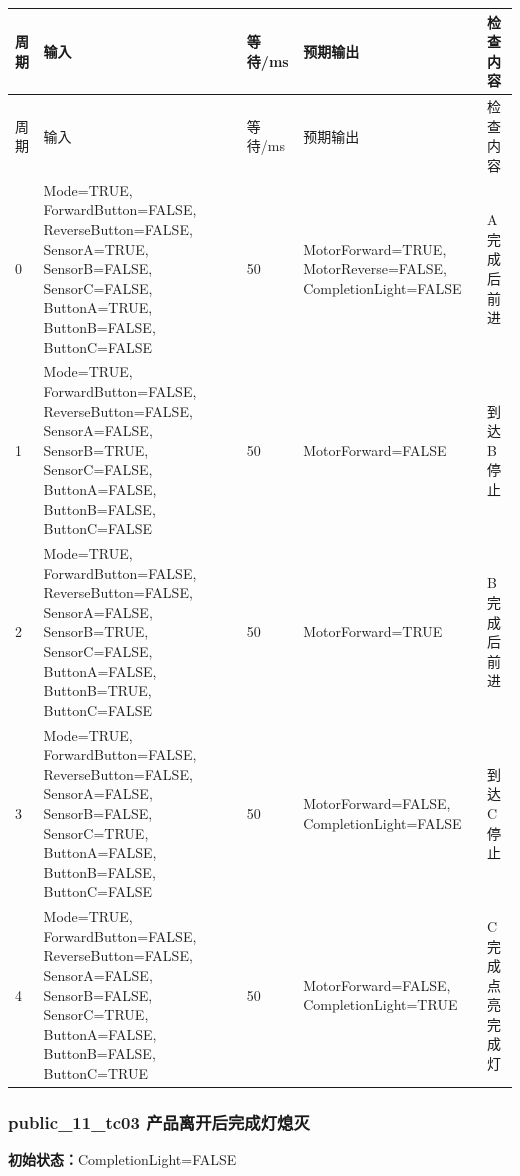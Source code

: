 \begin{longtable}{L{1.0cm}L{4.7cm}L{1.4cm}L{4.0cm}L{2.1cm}}

\toprule

周期 & 输入 & 等待/ms & 预期输出 & 检查内容\\

\midrule

\endfirsthead

\toprule

周期 & 输入 & 等待/ms & 预期输出 & 检查内容\\

\midrule

\endhead

0 & Mode=TRUE, ForwardButton=FALSE, ReverseButton=FALSE, SensorA=TRUE, SensorB=FALSE, SensorC=FALSE, ButtonA=TRUE, ButtonB=FALSE, ButtonC=FALSE & 50 & MotorForward=TRUE, MotorReverse=FALSE, CompletionLight=FALSE & A 完成后前进\\

1 & Mode=TRUE, ForwardButton=FALSE, ReverseButton=FALSE, SensorA=FALSE, SensorB=TRUE, SensorC=FALSE, ButtonA=FALSE, ButtonB=FALSE, ButtonC=FALSE & 50 & MotorForward=FALSE & 到达 B 停止\\

2 & Mode=TRUE, ForwardButton=FALSE, ReverseButton=FALSE, SensorA=FALSE, SensorB=TRUE, SensorC=FALSE, ButtonA=FALSE, ButtonB=TRUE, ButtonC=FALSE & 50 & MotorForward=TRUE & B 完成后前进\\

3 & Mode=TRUE, ForwardButton=FALSE, ReverseButton=FALSE, SensorA=FALSE, SensorB=FALSE, SensorC=TRUE, ButtonA=FALSE, ButtonB=FALSE, ButtonC=FALSE & 50 & MotorForward=FALSE, CompletionLight=FALSE & 到达 C 停止\\

4 & Mode=TRUE, ForwardButton=FALSE, ReverseButton=FALSE, SensorA=FALSE, SensorB=FALSE, SensorC=TRUE, ButtonA=FALSE, ButtonB=FALSE, ButtonC=TRUE & 50 & MotorForward=FALSE, CompletionLight=TRUE & C 完成点亮完成灯\\

\bottomrule

\end{longtable}

\subsubsection{{\ttfamily public\_11\_tc03} 产品离开后完成灯熄灭}

\noindent\textbf{初始状态：}CompletionLight=FALSE\\

